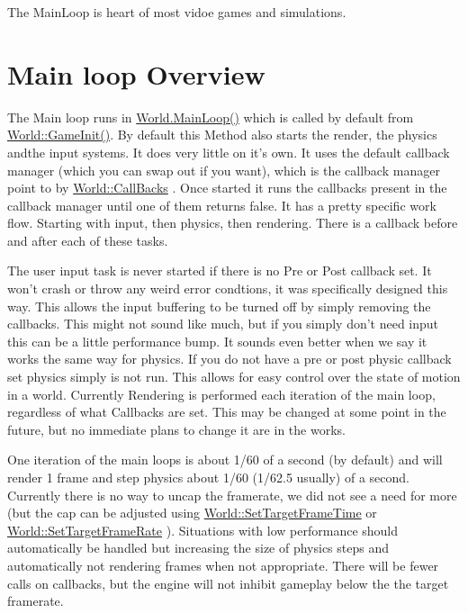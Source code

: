The MainLoop is heart of most vidoe games and simulations.\hypertarget{dd/d99/mainloop1_overview1}{}\section{Main loop Overview}\label{dd/d99/mainloop1_overview1}
The Main loop runs in \hyperlink{classphys_1_1World_af1d9e36d43f5e50543fa2351a32c8362}{World.MainLoop()} which is called by default from \hyperlink{classphys_1_1World_a21cc36be08a61f40619584d4c438936b}{World::GameInit()}. By default this Method also starts the render, the physics andthe input systems. It does very little on it's own. It uses the default callback manager (which you can swap out if you want), which is the callback manager point to by \hyperlink{classphys_1_1World_a22a1624c63198f49fdf8e448881bdb2e}{World::CallBacks} . Once started it runs the callbacks present in the callback manager until one of them returns false. It has a pretty specific work flow. Starting with input, then physics, then rendering. There is a callback before and after each of these tasks. \par
 \par
 The user input task is never started if there is no Pre or Post callback set. It won't crash or throw any weird error condtions, it was specifically designed this way. This allows the input buffering to be turned off by simply removing the callbacks. This might not sound like much, but if you simply don't need input this can be a little performance bump. It sounds even better when we say it works the same way for physics. If you do not have a pre or post physic callback set physics simply is not run. This allows for easy control over the state of motion in a world. Currently Rendering is performed each iteration of the main loop, regardless of what Callbacks are set. This may be changed at some point in the future, but no immediate plans to change it are in the works. \par
 \par
 One iteration of the main loops is about 1/60 of a second (by default) and will render 1 frame and step physics about 1/60 (1/62.5 usually) of a second. Currently there is no way to uncap the framerate, we did not see a need for more (but the cap can be adjusted using \hyperlink{classphys_1_1World_ad95b5a5ad73e0a05826b5bd834876333}{World::SetTargetFrameTime} or \hyperlink{classphys_1_1World_a76dfcde35392291aafd6eb1a64b3c95c}{World::SetTargetFrameRate} ). Situations with low performance should automatically be handled but increasing the size of physics steps and automatically not rendering frames when not appropriate. There will be fewer calls on callbacks, but the engine will not inhibit gameplay below the the target framerate. \par
